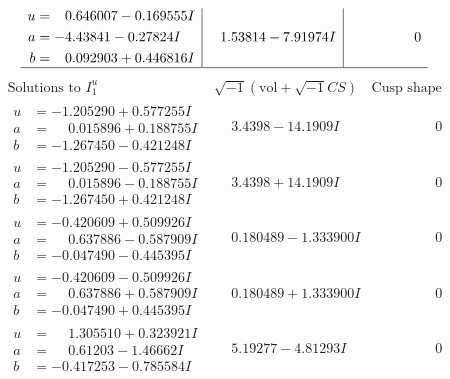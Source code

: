 \documentclass[1p]{elsarticle_modified}
\theoremstyle{definition}
\newcommand{\I}{\sqrt{-1}}
\begin{document}
$$\begin{array}{c|c|c}
\begin{aligned}
u &= \phantom{-}0.646007 - 0.169555 I \\
a &= -4.43841 - 0.27824 I \\
b &= \phantom{-}0.092903 + 0.446816 I\end{aligned}
 & \phantom{-}1.53814 - 7.91974 I & \phantom{-0.000000 } 0\\
 \hline 
 \end{array}$$\newpage$$\begin{array}{c|c|c}  
\text{Solutions to }I^u_{1}& \I (\text{vol} + \sqrt{-1}CS) & \text{Cusp shape}\\
 \hline 
\begin{aligned}
u &= -1.205290 + 0.577255 I \\
a &= \phantom{-}0.015896 + 0.188755 I \\
b &= -1.267450 - 0.421248 I\end{aligned}
 & \phantom{-}3.4398 - 14.1909 I & \phantom{-0.000000 } 0 \\ \hline\begin{aligned}
u &= -1.205290 - 0.577255 I \\
a &= \phantom{-}0.015896 - 0.188755 I \\
b &= -1.267450 + 0.421248 I\end{aligned}
 & \phantom{-}3.4398 + 14.1909 I & \phantom{-0.000000 } 0 \\ \hline\begin{aligned}
u &= -0.420609 + 0.509926 I \\
a &= \phantom{-}0.637886 - 0.587909 I \\
b &= -0.047490 - 0.445395 I\end{aligned}
 & \phantom{-}0.180489 - 1.333900 I & \phantom{-0.000000 } 0 \\ \hline\begin{aligned}
u &= -0.420609 - 0.509926 I \\
a &= \phantom{-}0.637886 + 0.587909 I \\
b &= -0.047490 + 0.445395 I\end{aligned}
 & \phantom{-}0.180489 + 1.333900 I & \phantom{-0.000000 } 0 \\ \hline\begin{aligned}
u &= \phantom{-}1.305510 + 0.323921 I \\
a &= \phantom{-}0.61203 - 1.46662 I \\
b &= -0.417253 - 0.785584 I\end{aligned}
 & \phantom{-}5.19277 - 4.81293 I & \phantom{-0.000000 } 0 \\ \hline\begin{aligned}

\end{aligned}
\end{array}$$
\end{document}
